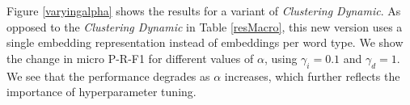 \documentclass{article}
\begin{document}
{{%


Figure \ref{varyingalpha} shows the results for a variant of {\textit{Clustering Dynamic}}. As opposed to the {\textit{Clustering Dynamic}} in Table \ref{resMacro}, this new version uses a single embedding representation instead of embeddings per word type. We show the change in micro P-R-F1 for different values of $\alpha$, using $\gamma_i=0.1$ and $\gamma_d=1$. We see that the performance degrades as $\alpha$ increases, which further reflects the importance of hyperparameter tuning.

}}
\end{document}
